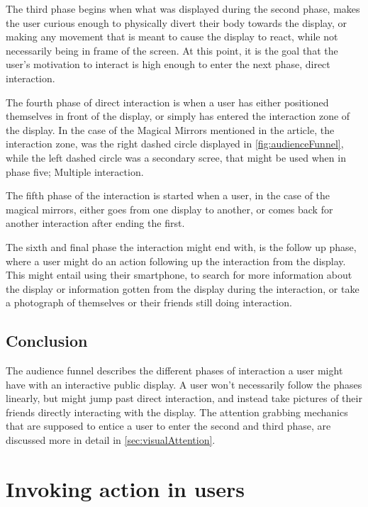     The third phase begins when what was displayed during the second phase, makes the user curious enough to physically divert their body towards the display, or making any movement that is meant to cause the display to react, while not necessarily being in frame of the screen. At this point, it is the goal that the user's motivation to interact is high enough to enter the next phase, direct interaction\cite{interactivePublicDisplays}.
    
    The fourth phase of direct interaction is when a user has either positioned themselves in front of the display, or simply has entered the interaction zone of the display. In the case of the Magical Mirrors mentioned in the article\cite{interactivePublicDisplays}, the interaction zone, was the right dashed circle displayed in \autoref{fig:audienceFunnel}, while the left dashed circle was a secondary scree, that might be used when in phase five; Multiple interaction.
    
    The fifth phase of the interaction is started when a user, in the case of the magical mirrors, either goes from one display to another, or comes back for another interaction after ending the first\cite{interactivePublicDisplays}.
    
    The sixth and final phase the interaction might end with, is the follow up phase, where a user might do an action following up the interaction from the display. This might entail using their smartphone, to search for more information about the display or information gotten from the display during the interaction, or take a photograph of themselves or their friends still doing interaction\cite{interactivePublicDisplays}. 
    
    \subsection*{Conclusion}
        The audience funnel describes the different phases of interaction a user might have with an interactive public display. A user won't necessarily follow the phases linearly, but might jump past direct interaction, and instead take pictures of their friends directly interacting with the display. The attention grabbing mechanics that are supposed to entice a user to enter the second and third phase, are discussed more in detail in \autoref{sec:visualAttention}.
\section{Invoking action in users} %

